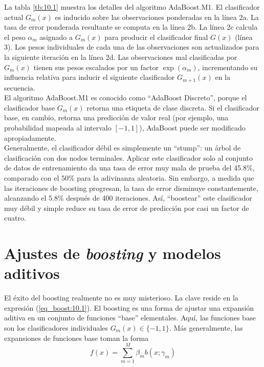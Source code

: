 La tabla \ref{tb:10.1} muestra los detalles del algoritmo AdaBoost.M1. El clasificador actual $G_m(x)$ es inducido sobre las observaciones ponderadas en la línea 2a. La tasa de error ponderada resultante se computa en la línea 2b. La línea 2c calcula el peso $\alpha_m$ asignado a $G_m(x)$ para producir el clasificador final $G(x)$ (línea 3). Los pesos individuales de cada una de las observaciones son actualizados para la siguiente iteración en la línea 2d. Las observaciones mal clasificadas por $G_m(x)$ tienen sus pesos escalados por un factor $\exp(\alpha_m)$, incrementando su influencia relativa para inducir el siguiente clasificador $G_{m+1}(x)$ en la secuencia. \\

El algoritmo AdaBoost.M1 es conocido como “AdaBoost Discreto”, porque el clasificador base $G_m(x)$ retorna una etiqueta de clase discreta. Si el clasificador base, en cambio, retorna una predicción de valor real (por ejemplo, una probabilidad mapeada al intervalo $[-1, 1]$), AdaBoost puede ser modificado apropiadamente. \\



Generalmente, el clasificador débil es simplemente un ``stump'': un árbol de clasificación con dos nodos terminales. Aplicar este clasificador solo al conjunto de datos de entrenamiento da una tasa de error muy mala de prueba del 45.8\%, comparado con el 50\% para la adivinanza aleatoria. Sin embargo, a medida que las iteraciones de boosting progresan, la tasa de error disminuye constantemente, alcanzando el 5.8\% después de 400 iteraciones. Así, ``boostear'' este clasificador muy débil y simple reduce su tasa de error de predicción por casi un factor de cuatro. 

\section{Ajustes de \textit{boosting} y modelos aditivos}

El éxito del boosting realmente no es muy misterioso. La clave reside en la expresión (\ref{eq_boost:10.1}). El boosting es una forma de ajustar una expansión aditiva en un conjunto de funciones ``base'' elementales. Aquí, las funciones base son los clasificadores individuales $G_m(x) \in \{-1,1\}$. Más generalmente, las expansiones de funciones base toman la forma
\begin{equation}
f(x) = \sum_{m=1}^{M} \beta_m b(x; \gamma_m) 
\end{equation}

